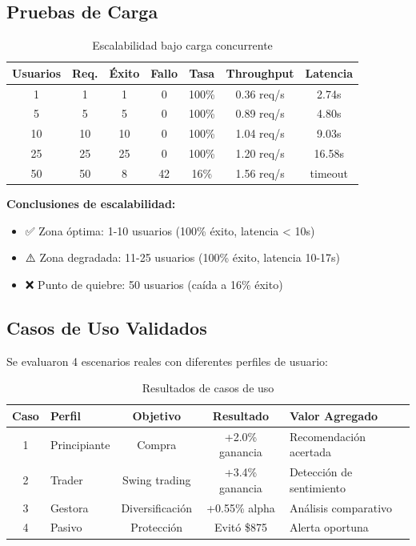 \documentclass[12pt,a4paper]{article}
\begin{document}
\subsection{Pruebas de Carga}

\begin{table}[H]
\centering
\small
\begin{tabular}{ccccccc}
\toprule
\textbf{Usuarios} & \textbf{Req.} & \textbf{Éxito} & \textbf{Fallo} & \textbf{Tasa} & \textbf{Throughput} & \textbf{Latencia} \\
\midrule
1 & 1 & 1 & 0 & 100\% & 0.36 req/s & 2.74s \\
5 & 5 & 5 & 0 & 100\% & 0.89 req/s & 4.80s \\
10 & 10 & 10 & 0 & 100\% & 1.04 req/s & 9.03s \\
25 & 25 & 25 & 0 & 100\% & 1.20 req/s & 16.58s \\
50 & 50 & 8 & 42 & 16\% & 1.56 req/s & timeout \\
\bottomrule
\end{tabular}
\caption{Escalabilidad bajo carga concurrente}
\end{table}

\textbf{Conclusiones de escalabilidad:}
\begin{itemize}
    \item ✅ Zona óptima: 1-10 usuarios (100\% éxito, latencia < 10s)
    \item ⚠️ Zona degradada: 11-25 usuarios (100\% éxito, latencia 10-17s)
    \item ❌ Punto de quiebre: 50 usuarios (caída a 16\% éxito)
\end{itemize}

\subsection{Casos de Uso Validados}

Se evaluaron 4 escenarios reales con diferentes perfiles de usuario:

\begin{table}[H]
\centering
\small
\begin{tabular}{clccp{4cm}}
\toprule
\textbf{Caso} & \textbf{Perfil} & \textbf{Objetivo} & \textbf{Resultado} & \textbf{Valor Agregado} \\
\midrule
1 & Principiante & Compra & +2.0\% ganancia & Recomendación acertada \\
2 & Trader & Swing trading & +3.4\% ganancia & Detección de sentimiento \\
3 & Gestora & Diversificación & +0.55\% alpha & Análisis comparativo \\
4 & Pasivo & Protección & Evitó \$875 & Alerta oportuna \\
\bottomrule
\end{tabular}
\caption{Resultados de casos de uso}
\end{table}
\end{document}
